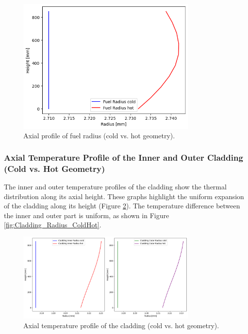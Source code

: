 \begin{figure}[H]
\centering
\includegraphics[width=0.8\textwidth]{1b_fuel_coldhot.png}
\caption{Axial profile of fuel radius (cold vs. hot geometry).}
\label{fig:Fuel_Radius_ColdHot}
\end{figure}

\subsubsection{Axial Temperature Profile of the Inner and Outer Cladding (Cold vs. Hot Geometry)}

The inner and outer temperature profiles of the cladding show the thermal distribution along its axial height. These graphs highlight the uniform expansion of the cladding along its height (Figure \ref{fig:Cladding_InOut_Temperature_Hot}). The temperature difference between the inner and outer part is uniform, as shown in Figure \ref{fig:Cladding_Radius_ColdHot}.

\begin{figure}[H]
\centering
\includegraphics[width=0.8\textwidth]{2_cladding_in_out_coldhot.png}
\caption{Axial temperature profile of the cladding (cold vs. hot geometry).}
\label{fig:Cladding_InOut_Temperature_Hot}
\end{figure}

